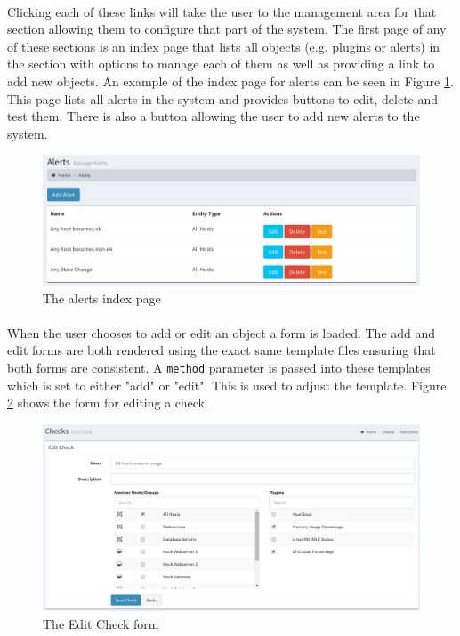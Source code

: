 \documentclass[bsc,logo,twoside,singlespacing]{infthesis}
\begin{document}
\paragraph*{}
	Clicking each of these links will take the user to the management area for
	that section allowing them to configure that part of the system.  The first
	page of any of these sections is an index page that lists all objects (e.g.
	plugins or alerts) in the section with options to manage each of them as well
	as providing a link to add new objects.  An example of the index page for
	alerts can be seen in Figure \ref{alerts-index}.  This page lists all alerts
	in the system and provides buttons to edit, delete and test them. There is
	also a button allowing the user to add new alerts to the system.
	
\begin{figure}[H]
	\caption{The alerts index page}
	\label{alerts-index}
	\includegraphics[scale=0.55]{assets/screenshots/alerts-index.pdf}
\end{figure}
	
\paragraph*{}
	When the user chooses to add or edit an object a form is loaded.  The add and
	edit forms are both rendered using the exact same template files ensuring that
	both forms are consistent.  A \texttt{method} parameter is passed into these
	templates which is set to either "add" or "edit".  This is used to adjust the
	template.  Figure \ref{edit-check} shows the form for editing a check.

\begin{figure}[H]
	\caption{The Edit Check form}
	\label{edit-check}
	\includegraphics[scale=0.45]{assets/screenshots/edit-check.pdf}
\end{figure}	
\end{document}
